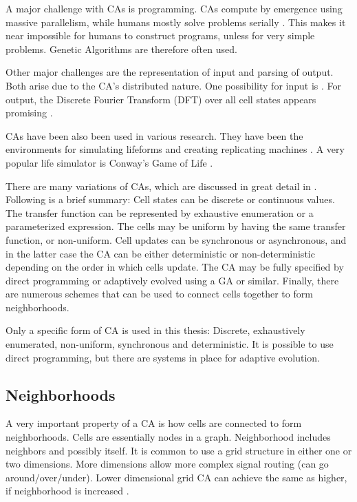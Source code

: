A major challenge with CAs is programming.
CAs compute by emergence using massive parallelism, while humans mostly solve problems serially \cite{newell1972problemsolving}.
This makes it near impossible for humans to construct programs, unless for very simple problems.
Genetic Algorithms are therefore often used.

Other major challenges are the representation of input and parsing of output.
Both arise due to the CA's distributed nature.
One possibility for input is \TODO.
For output, the Discrete Fourier Transform (DFT) over all cell states appears promising \cite{berg2013ca}.

CAs have been also been used in various research.
They have been the environments for simulating lifeforms and creating replicating machines \cite{neumann1966selfreplication}.
A very popular life simulator is Conway's Game of Life \cite{gardner1970life}.

There are many variations of CAs, which are discussed in great detail in \cite{sipper1999emergence}.
Following is a brief summary:
Cell states can be discrete or continuous values.
The transfer function can be represented by exhaustive enumeration or a parameterized expression.
The cells may be uniform by having the same transfer function, or non-uniform.
Cell updates can be synchronous or asynchronous, and in the latter case the CA can be either deterministic or non-deterministic depending on the order in which cells update.
The CA may be fully specified by direct programming or adaptively evolved using a GA or similar.
Finally, there are numerous schemes that can be used to connect cells together to form neighborhoods.

Only a specific form of CA is used in this thesis:
Discrete, exhaustively enumerated, non-uniform, synchronous and deterministic.
It is possible to use direct programming, but there are systems in place for adaptive evolution.

\subsection{Neighborhoods}

A very important property of a CA is how cells are connected to form neighborhoods.
Cells are essentially nodes in a graph.
Neighborhood includes neighbors and possibly itself.
It is common to use a grid structure in either one or two dimensions.
More dimensions allow more complex signal routing (can go around/over/under).
Lower dimensional grid CA can achieve the same as higher, if neighborhood is increased \CN.

